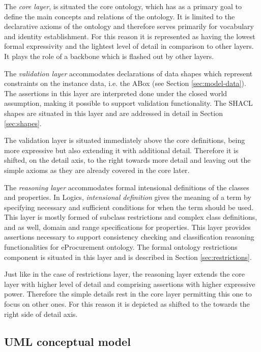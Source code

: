 	The \textit{core layer}, is situated the core ontology, which has as a primary goal to define the main concepts and relations of the ontology. It is limited to the declarative axioms of the ontology and therefore serves primarily for vocabulary and identity establishment. For this reason it is represented as having the lowest formal expressivity and the lightest level of detail in comparison to other layers. It plays the role of a backbone which is flashed out by other layers. 

	The \textit{validation layer} accommodates declarations of data shapes which represent constraints on the instance data, i.e. the ABox (see Section \ref{sec:model-data}). The assertions in this layer are interpreted done under the closed world assumption, making it possible to support validation functionality. The SHACL shapes are situated in this layer and are addressed in detail in Section \ref{sec:shapes}.
	
	The validation layer is situated immediately above the core definitions, being more expressive but also extending it with additional detail. Therefore it is shifted, on the detail axis, to the right towards more detail and leaving out the simple axioms as they are already covered in the core later.
	
	The \textit{reasoning layer} accommodates formal intensional definitions of the classes and properties. In Logics, \textit{intensional definition} gives the meaning of a term by specifying necessary and sufficient conditions for when the term should be used. This layer is mostly formed of subclass restrictions and complex class definitions, and as well, domain and range specifications for properties. This layer provides assertions necessary to support consistency checking and classification reasoning functionalities for eProcurement ontology. The formal ontology restrictions component is situated in this layer and is described in Section \ref{sec:restrictions}.
	
	Just like in the case of restrictions layer, the reasoning layer extends the core layer with higher level of detail and comprising assertions with higher expressive power. Therefore the simple details rest in the core layer permitting this one to focus on other ones. For this reason it is depicted as shifted to the towards the right side of detail axis.
	
	
	\subsection{UML conceptual model}
	\label{sec:uml-model}	
	

